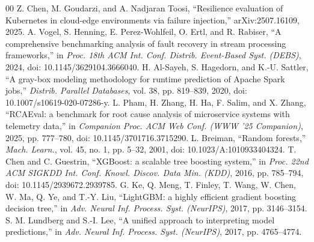 \documentclass[conference]{IEEEtran}
\begin{document}
\begin{thebibliography}{00}
 Z. Chen, M. Goudarzi, and A. Nadjaran Toosi, ``Resilience evaluation of Kubernetes in cloud-edge environments via failure injection,'' arXiv:2507.16109, 2025.
 A. Vogel, S. Henning, E. Perez-Wohlfeil, O. Ertl, and R. Rabiser, ``A comprehensive benchmarking analysis of fault recovery in stream processing frameworks,'' in \textit{Proc. 18th ACM Int. Conf. Distrib. Event-Based Syst. (DEBS)}, 2024, doi: 10.1145/3629104.3666040.
 H. Al-Sayeh, S. Hagedorn, and K.-U. Sattler, ``A gray-box modeling methodology for runtime prediction of Apache Spark jobs,'' \textit{Distrib. Parallel Databases}, vol. 38, pp. 819--839, 2020, doi: 10.1007/s10619-020-07286-y.
 L. Pham, H. Zhang, H. Ha, F. Salim, and X. Zhang, ``RCAEval: a benchmark for root cause analysis of microservice systems with telemetry data,'' in \textit{Companion Proc. ACM Web Conf. (WWW '25 Companion)}, 2025, pp. 777--780, doi: 10.1145/3701716.3715290.
 L. Breiman, ``Random forests,'' \textit{Mach. Learn.}, vol. 45, no. 1, pp. 5--32, 2001, doi: 10.1023/A:1010933404324.
 T. Chen and C. Guestrin, ``XGBoost: a scalable tree boosting system,'' in \textit{Proc. 22nd ACM SIGKDD Int. Conf. Knowl. Discov. Data Min. (KDD)}, 2016, pp. 785--794, doi: 10.1145/2939672.2939785.
 G. Ke, Q. Meng, T. Finley, T. Wang, W. Chen, W. Ma, Q. Ye, and T.-Y. Liu, ``LightGBM: a highly efficient gradient boosting decision tree,'' in \textit{Adv. Neural Inf. Process. Syst. (NeurIPS)}, 2017, pp. 3146--3154.
 S. M. Lundberg and S.-I. Lee, ``A unified approach to interpreting model predictions,'' in \textit{Adv. Neural Inf. Process. Syst. (NeurIPS)}, 2017, pp. 4765--4774.
\end{thebibliography}
\end{document}
